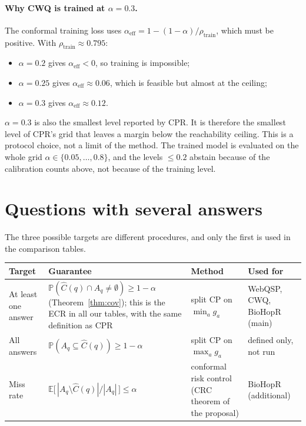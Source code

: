 \documentclass[11pt,a4paper]{article}
\theoremstyle{definition}
\theoremstyle{remark}
\newcommand{\Prob}{\mathbb{P}}
\newcommand{\E}{\mathbb{E}}
\begin{document}
\paragraph{Why CWQ is trained at $\alpha=0.3$.}
The conformal training loss uses $\alpha_{\mathrm{eff}}=1-(1-\alpha)/\rho_{\mathrm{train}}$, which must be positive. With $\rho_{\mathrm{train}}\approx0.795$:
\begin{itemize}[nosep]
  \item $\alpha=0.2$ gives $\alpha_{\mathrm{eff}}<0$, so training is impossible;
  \item $\alpha=0.25$ gives $\alpha_{\mathrm{eff}}\approx0.06$, which is feasible but almost at the ceiling;
  \item $\alpha=0.3$ gives $\alpha_{\mathrm{eff}}\approx0.12$.
\end{itemize}
$\alpha=0.3$ is also the smallest level reported by CPR. It is therefore the smallest level of CPR's grid that leaves a margin below the reachability ceiling. This is a protocol choice, not a limit of the method. The trained model is evaluated on the whole grid $\alpha\in\{0.05,\dots,0.8\}$, and the levels $\le0.2$ abstain because of the calibration counts above, not because of the training level.

\section{Questions with several answers}

The three possible targets are different procedures, and only the first is used in the comparison tables.

\begin{center}
\begin{tabularx}{\textwidth}{@{}l>{\raggedright\arraybackslash}X>{\raggedright\arraybackslash}p{3.3cm}l@{}}
\toprule
Target & Guarantee & Method & Used for\\
\midrule
At least one answer & $\Prob(\hat C(q)\cap A_q\neq\emptyset)\ge1-\alpha$ (Theorem~\ref{thm:cov}); this is the ECR in all our tables, with the same definition as CPR & split CP on $\min_a g_a$ & WebQSP, CWQ, BioHopR (main)\\
All answers & $\Prob(A_q\subseteq\hat C(q))\ge1-\alpha$ & split CP on $\max_a g_a$ & defined only, not run\\
Miss rate & $\E\big[\,|A_q\setminus\hat C(q)|/|A_q|\,\big]\le\alpha$ & conformal risk control (CRC theorem of the proposal) & BioHopR (additional)\\
\bottomrule
\end{tabularx}
\end{center}
\end{document}
